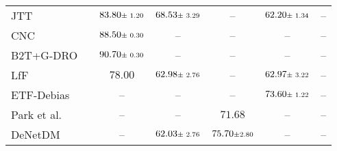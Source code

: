 {\begin{tabular}{lcccccc}
		JTT      \small{\cite{pmlr-v139-liu21f_JTT}}                             &    \textcolor{green}{\tick}     &       $83.80 \text{\scriptsize{$\pm$ 1.20}}$       &       $68.53 \text{\scriptsize{$\pm$ 3.29}}$       &                         --                         &       $62.20 \text{\scriptsize{$\pm$ 1.34}}$       &                         --                         \\
		CNC      \small{\cite{pmlr-v162-zhang22z}}                               &    \textcolor{green}{\tick}     &       $88.50 \text{\scriptsize{$\pm$ 0.30}}$       &                         --                         &                         --                         &                         --                         &                         --                         \\
		B2T+G-DRO \small{\cite{kim2024discovering}}                              &    \textcolor{green}{\tick}     &       $90.70 \text{\scriptsize{$\pm$ 0.30}}$       &                         --                         &                         --                         &                         --                         &                         --                         \\
		LfF \small{\cite{nam2020learning}}                                       &    \textcolor{green}{\tick}     &                      $78.00$                       &       $62.98 \text{\scriptsize{$\pm$ 2.76}}$       &                         --                         &       $62.97 \text{\scriptsize{$\pm$ 3.22}}$       &                         --                         \\
		ETF-Debias \small{\cite{wang2024navigate}}                               &    \textcolor{green}{\tick}     &                         --                         &                        {--}                        &                         --                         & \underline{$73.60 \text{\scriptsize{$\pm$ 1.22}}$} &                         --                         \\
		Park et al. \small{\cite{park2024enhancing}}                             &    \textcolor{green}{\tick}     &                         --                         &                        {--}                        &                      $71.68$                       &                         --                         &                         --                         \\
		DeNetDM \small{\cite{vadakkeeveetil2024denetdm}}                         &    \textcolor{green}{\tick}     &                         --                         &       $62.03 \text{\scriptsize{$\pm$ 2.76}}$       &       $75.70 \text{\scriptsize{$\pm $2.80}}$       &                         --                         &                         --                         \\

\end{tabular}}
